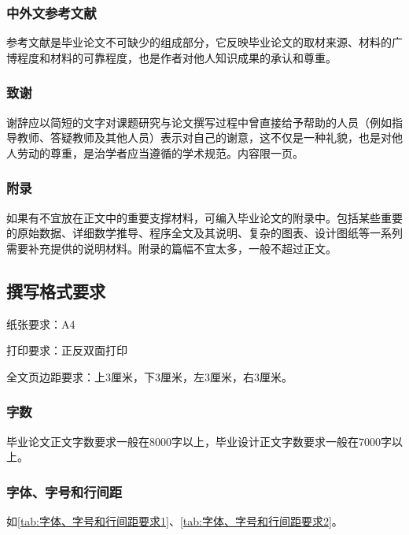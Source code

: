 \subsubsection{中外文参考文献}

参考文献是毕业论文不可缺少的组成部分，它反映毕业论文的取材来源、材料的广博程度和材料的可靠程度，也是作者对他人知识成果的承认和尊重。

\subsubsection{致谢}

谢辞应以简短的文字对课题研究与论文撰写过程中曾直接给予帮助的人员（例如指导教师、答疑教师及其他人员）表示对自己的谢意，这不仅是一种礼貌，也是对他人劳动的尊重，是治学者应当遵循的学术规范。内容限一页。

\subsubsection{附录}
如果有不宜放在正文中的重要支撑材料，可编入毕业论文的附录中。包括某些重要的原始数据、详细数学推导、程序全文及其说明、复杂的图表、设计图纸等一系列需要补充提供的说明材料。附录的篇幅不宜太多，一般不超过正文。

\subsection{撰写格式要求}

纸张要求：A4

打印要求：正反双面打印

全文页边距要求：上3厘米，下3厘米，左3厘米，右3厘米。

\subsubsection{字数}

毕业论文正文字数要求一般在8000字以上，毕业设计正文字数要求一般在7000字以上。

\subsubsection{字体、字号和行间距}

如\cref{tab:字体、字号和行间距要求1}、\cref{tab:字体、字号和行间距要求2}。

